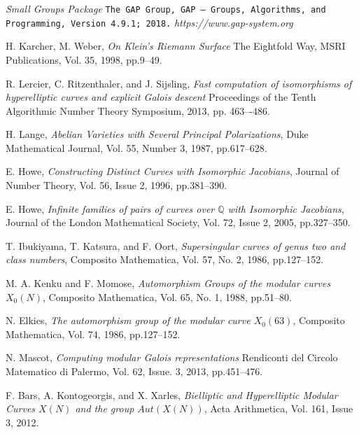 \documentclass[12pt,reqno]{amsart}
\newcommand{\Q}{\mathbb{Q}}
\theoremstyle{definition}
\theoremstyle{remark}
\begin{document}
\begin{thebibliography}{9}
\bibitem{[GAP2018]}
\textit{Small Groups Package}
\texttt{The GAP Group, GAP -- Groups, Algorithms, and Programming, Version 4.9.1; 2018.}
\textit{https://www.gap-system.org}



H. Karcher, M. Weber,
\textit{On Klein's Riemann Surface}
The Eightfold Way, MSRI Publications, 
Vol. 35, 1998, pp.9--49.


R. Lercier, C. Ritzenthaler, and J. Sijsling,
\textit{Fast computation of isomorphisms of hyperelliptic curves and explicit Galois descent}
Proceedings of the Tenth Algorithmic Number Theory Symposium, 2013, pp. 463–-486.

H. Lange,
\textit{Abelian Varieties with Several Principal Polarizations},
Duke Mathematical Journal,
Vol. 55, Number 3, 1987, pp.617--628.

E. Howe,
\textit{Constructing Distinct Curves with Isomorphic Jacobians},
Journal of Number Theory,
Vol. 56, Issue 2, 1996, pp.381--390.

E. Howe,
\textit{Infinite families of pairs of curves over $\Q$ with Isomorphic Jacobians},
Journal of the London Mathematical Society,
Vol. 72, Issue 2, 2005, pp.327--350.

T. Ibukiyama, T. Katsura, and F. Oort,
\textit{Supersingular curves of genus two and class numbers},
Composito Mathematica,
Vol. 57, No. 2, 1986, pp.127--152.

M. A. Kenku and F. Momose,
\textit{Automorphism Groups of the modular curves $X_0(N)$},
Composito Mathematica,
Vol. 65, No. 1, 1988, pp.51--80.
 
N. Elkies,
\textit{The automorphism group of the modular curve $X_0(63)$},
Composito Mathematica,
Vol. 74, 1986, pp.127--152.

N. Mascot,
\textit{Computing modular Galois representations}
Rendiconti del Circolo Matematico di Palermo,
Vol. 62, Issue. 3, 2013, pp.451--476.

F. Bars, A. Kontogeorgis, and X. Xarles,
\textit{Bielliptic and Hyperelliptic Modular Curves $X(N)$ and the group $Aut(X(N))$},
Acta Arithmetica,
Vol. 161, Issue 3, 2012.

\end{thebibliography}





\end{document}
